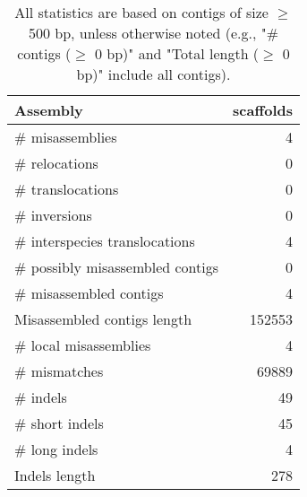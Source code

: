 \documentclass[12pt,a4paper]{article}
\begin{document}
\begin{table}[ht]
\begin{center}
\caption{All statistics are based on contigs of size $\geq$ 500 bp, unless otherwise noted (e.g., "\# contigs ($\geq$ 0 bp)" and "Total length ($\geq$ 0 bp)" include all contigs).}
\begin{tabular}{|l*{1}{|r}|}
\hline
Assembly & scaffolds \\ \hline
\# misassemblies & 4 \\ \hline
\hspace{5mm}\# relocations & 0 \\ \hline
\hspace{5mm}\# translocations & 0 \\ \hline
\hspace{5mm}\# inversions & 0 \\ \hline
\hspace{5mm}\# interspecies translocations & 4 \\ \hline
\# possibly misassembled contigs & 0 \\ \hline
\# misassembled contigs & 4 \\ \hline
Misassembled contigs length & 152553 \\ \hline
\# local misassemblies & 4 \\ \hline
\# mismatches & 69889 \\ \hline
\# indels & 49 \\ \hline
\hspace{5mm}\# short indels & 45 \\ \hline
\hspace{5mm}\# long indels & 4 \\ \hline
Indels length & 278 \\ \hline
\end{tabular}
\end{center}
\end{table}
\end{document}

